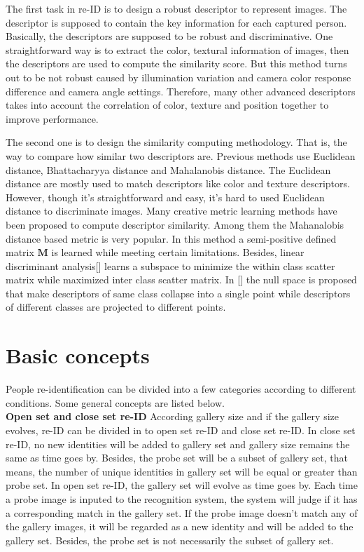 The first task in re-ID is to design a robust descriptor to represent images. The descriptor is supposed to contain the key information for each captured person. Basically, the descriptors are supposed to be robust and discriminative. One straightforward way is to extract the color, textural information of images, then the descriptors are used to compute the similarity score. But this method turns out to be not robust caused by illumination variation  and camera color response difference and camera angle settings.  Therefore, many other advanced descriptors takes into account the correlation of color, texture and position together to improve performance.


The second one is to design the similarity computing methodology. That is, the way to compare how similar two descriptors are. Previous methods use Euclidean distance, Bhattacharyya distance and Mahalanobis distance. The Euclidean distance are mostly used to match descriptors like color and texture descriptors. However, though it's straightforward and easy, it's hard to used Euclidean distance to discriminate images. 
Many creative metric learning methods have been proposed to compute descriptor similarity. Among them the Mahanalobis distance based metric is very popular. In this method a semi-positive defined matrix $\bm{M}$ is learned while meeting certain limitations. Besides, linear discriminant analysis[] learns a subspace to minimize the within class scatter matrix while maximized inter class scatter matrix. In [] the null space is proposed that make descriptors of same class collapse into a single point while descriptors of different classes are projected to different points. 
	
\section{Basic concepts}
People re-identification can be divided into a few categories according to different conditions. Some general concepts are listed below.\\
\textbf{Open set and close set re-ID} According gallery size and if the gallery size evolves, re-ID can be divided in to open set re-ID and close set re-ID. In close set re-ID, no new identities will be added to gallery set and gallery size remains the same as time goes by. Besides, the probe set will be a subset of gallery set, that means, the number of unique identities in gallery set will be equal or greater than probe set. In open set re-ID, the gallery set will evolve as time goes by. Each time a probe image is inputed to the recognition system, the system will judge if it has a corresponding match in the gallery set. If the probe image doesn't match any of the gallery images, it will be regarded as a new identity and will be added to the gallery set. Besides, the probe set is not necessarily the subset of gallery set. 

